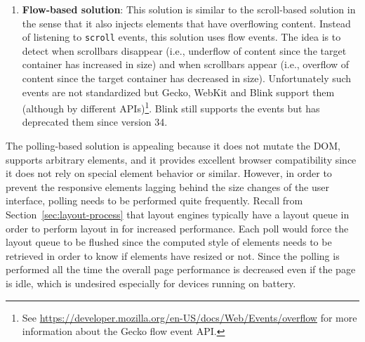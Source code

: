 \documentclass[a4paper,11pt]{kth-mag}
\newcommand{\code}[1]{\texttt{#1}}
\begin{document}
\begin{enumerate}
            For detecting when the target \gls{element} shrinks, two \glspl{element} are needed; one for handling the scrollbars and one for causing them to scroll.
            Similarly, for detecting when the target \gls{element} expands, two \glspl{element} are needed in the same way.
            A container \gls{element} is injected that contains the four \glspl{element} and is styled so that it matches the size of the target \gls{element} and so that it does not affect the page visually.
          \item\label{itm:erd-approach-flow}
            \textbf{Flow-based solution}:
            This solution is similar to the scroll-based solution in the sense that it also injects \glspl{element} that have overflowing content.
            Instead of listening to \code{scroll} events, this solution uses flow events.
            The idea is to detect when scrollbars disappear (i.e., underflow of content since the target container has increased in size) and when scrollbars appear (i.e., overflow of content since the target container has decreased in size).
            Unfortunately such events are not standardized but \gls{Gecko}, \gls{WebKit} and \gls{Blink} support them (although by different \glspl{API})\footnote{See \url{https://developer.mozilla.org/en-US/docs/Web/Events/overflow} for more information about the \gls{Gecko} flow event \gls{API}.}.
            \gls{Blink} still supports the events but has deprecated them \cite{blink_deprecated_flow_events} since version 34.
        \end{enumerate}
        The polling-based solution is appealing because it does not mutate the \gls{DOM}, supports arbitrary \glspl{element}, and it provides excellent \gls{browser} compatibility since it does not rely on special \gls{element} behavior or similar.
        However, in order to prevent the \gls{responsive} \glspl{element} lagging behind the size changes of the user interface, polling needs to be performed quite frequently.
        Recall from Section~\ref{sec:layout-process} that \glspl{layout engine} typically have a layout queue in order to perform layout in  for increased performance.
        Each poll would force the layout queue to be flushed since the computed style of \glspl{element} needs to be retrieved in order to know if \glspl{element} have resized or not.
        Since the polling is performed all the time the overall page performance is decreased even if the page is idle, which is undesired especially for devices running on battery.
\end{document}
